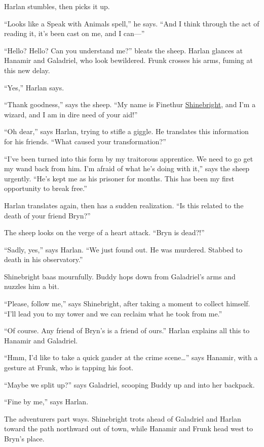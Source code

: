 \documentclass[smalldemyvopaper,11pt,twoside,onecolumn,openright,extrafontsizes]{memoir}
\begin{document}
Harlan stumbles, then picks it up.

``Looks like a Speak with Animals spell,'' he says. ``And I think
through the act of reading it, it's been cast on me, and I can---''

``Hello? Hello? Can you understand me?'' bleats the sheep. Harlan
glances at Hanamir and Galadriel, who look bewildered. Frunk crosses his
arms, fuming at this new delay.

``Yes,'' Harlan says.

``Thank goodness,'' says the sheep. ``My name is Finethur
\href{/characters/shinebright/}{Shinebright}, and I'm a wizard, and I am
in dire need of your aid!''

``Oh dear,'' says Harlan, trying to stifle a giggle. He translates this
information for his friends. ``What caused your transformation?''

``I've been turned into this form by my traitorous apprentice. We need
to go get my wand back from him. I'm afraid of what he's doing with
it,'' says the sheep urgently. ``He's kept me as his prisoner for
months. This has been my first opportunity to break free.''

Harlan translates again, then has a sudden realization. ``Is this
related to the death of your friend Bryn?''

The sheep looks on the verge of a heart attack. ``Bryn is dead?!''

``Sadly, yes,'' says Harlan. ``We just found out. He was murdered.
Stabbed to death in his observatory.''

Shinebright baas mournfully. Buddy hops down from Galadriel's arms and
nuzzles him a bit.

``Please, follow me,'' says Shinebright, after taking a moment to
collect himself. ``I'll lead you to my tower and we can reclaim what he
took from me.''

``Of course. Any friend of Bryn's is a friend of ours.'' Harlan explains
all this to Hanamir and Galadriel.

``Hmm, I'd like to take a quick gander at the crime scene\ldots{}'' says
Hanamir, with a gesture at Frunk, who is tapping his foot.

``Maybe we split up?'' says Galadriel, scooping Buddy up and into her
backpack.

``Fine by me,'' says Harlan.

The adventurers part ways. Shinebright trots ahead of Galadriel and
Harlan toward the path northward out of town, while Hanamir and Frunk
head west to Bryn's place.
\end{document}
